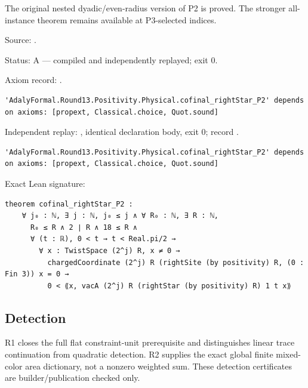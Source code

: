 \begin{theorem}[bp-499]
\label{bp-499}
\leanok
The original nested dyadic/even-radius version of P2 is proved. The stronger all-instance theorem remains available at P3-selected indices.

\par Source: \texttt{}.
\par Status: A — compiled and independently replayed; exit 0.
\par Axiom record: \texttt{}.
\begin{verbatim}
'AdalyFormal.Round13.Positivity.Physical.cofinal_rightStar_P2' depends on axioms: [propext, Classical.choice, Quot.sound]
\end{verbatim}
\par Independent replay: \texttt{}, identical declaration body, exit 0; record \texttt{}.
\begin{verbatim}
'AdalyFormal.Round13.Positivity.Physical.cofinal_rightStar_P2' depends on axioms: [propext, Classical.choice, Quot.sound]
\end{verbatim}
\par Exact Lean signature:
\begin{verbatim}
theorem cofinal_rightStar_P2 :
    ∀ j₀ : ℕ, ∃ j : ℕ, j₀ ≤ j ∧ ∀ R₀ : ℕ, ∃ R : ℕ,
      R₀ ≤ R ∧ 2 ∣ R ∧ 18 ≤ R ∧
      ∀ (t : ℝ), 0 < t → t < Real.pi/2 →
        ∀ x : TwistSpace (2^j) R, x ≠ 0 →
          chargedCoordinate (2^j) R (rightSite (by positivity) R, (0 : Fin 3)) x = 0 →
          0 < ⟪x, vacA (2^j) R (rightStar (by positivity) R) 1 t x⟫
\end{verbatim}
\end{theorem}

\subsection{Detection}

R1 closes the full flat constraint-unit prerequisite and distinguishes linear trace continuation from quadratic detection. R2 supplies the exact global finite mixed-color area dictionary, not a nonzero weighted sum. These detection certificates are builder/publication checked only.

